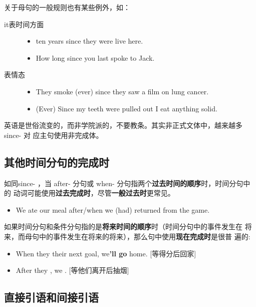 关于母句的一般规则也有某些例外，如：
\begin{description}
\item[it表时间方面]
  \begin{itemize}
  \item {} ten years since they were live here.

  \item How long  since you last spoke to Jack.
  \end{itemize}

\item[表情态]
  \begin{itemize}
  \item They  smoke (ever) since they saw a film on lung cancer.

  \item (Ever) Since my teeth were pulled out I  eat anything solid.
  \end{itemize}
\end{description}

英语是世俗流变的，而非学院派的，不要教条。其实非正式文体中，越来越多since- 对
应主句使用非完成体。

\subsection{其他时间分句的完成时}

如同since- ，当 after- 分句或 when- 分句指两个\textbf{过去时间的顺序}时，时间分句中的
动词可能使用\textbf{过去完成时}，尽管\textbf{一般过去时}更常见。
\begin{itemize}
\item We ate our meal after/when we (had) returned from the game.
\end{itemize}


如果时间分句和条件分句指的是\textbf{将来时间的顺序}时（时间分句中的事件发生在
将来，而母句中的事件发生在将来的将来），那么句中使用\textbf{现在完成时}是很普
遍的:
\begin{itemize}
\item When they their next goal, we\textbf{'ll go} home.
  [等得分后回家]

\item After they , we . [等他们离开后抽烟]
\end{itemize}


\subsection{直接引语和间接引语}

